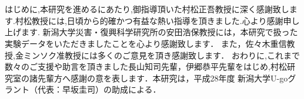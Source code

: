 \chapter{}
はじめに,本研究を進めるにあたり,御指導頂いた村松正吾教授に深く感謝致します.村松教授には,日頃から的確かつ有益な熱い指導を頂きました.心より感謝申し上げます.
新潟大学災害・復興科学研究所の安田浩保教授には，本研究で扱った実験データをいただきましたことを心より感謝致します．
また，佐々木重信教授,金ミンソク准教授には多くのご意見を頂き感謝致します．
おわりに,これまで数々のご支援や助言を頂きました長山知司先輩，伊郷恭平先輩をはじめ,村松研究室の諸先輩方へ感謝の意を表します．本研究は，平成28年度 新潟大学U-goグラント（代表：早坂圭司）の助成による．
